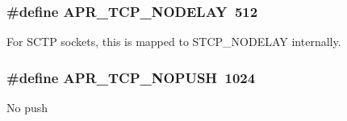 \subsubsection[{\texorpdfstring{A\+P\+R\+\_\+\+T\+C\+P\+\_\+\+N\+O\+D\+E\+L\+AY}{APR_TCP_NODELAY}}]{\setlength{\rightskip}{0pt plus 5cm}\#define A\+P\+R\+\_\+\+T\+C\+P\+\_\+\+N\+O\+D\+E\+L\+AY~512}\hypertarget{group__apr__sockopt_ga24db924d850dea792e92be7f8bc45cbd}{}\label{group__apr__sockopt_ga24db924d850dea792e92be7f8bc45cbd}
For S\+C\+TP sockets, this is mapped to S\+T\+C\+P\+\_\+\+N\+O\+D\+E\+L\+AY internally. 
\subsubsection[{\texorpdfstring{A\+P\+R\+\_\+\+T\+C\+P\+\_\+\+N\+O\+P\+U\+SH}{APR_TCP_NOPUSH}}]{\setlength{\rightskip}{0pt plus 5cm}\#define A\+P\+R\+\_\+\+T\+C\+P\+\_\+\+N\+O\+P\+U\+SH~1024}\hypertarget{group__apr__sockopt_ga7679a9e3114815eb6c31d26db707975d}{}\label{group__apr__sockopt_ga7679a9e3114815eb6c31d26db707975d}
No push 